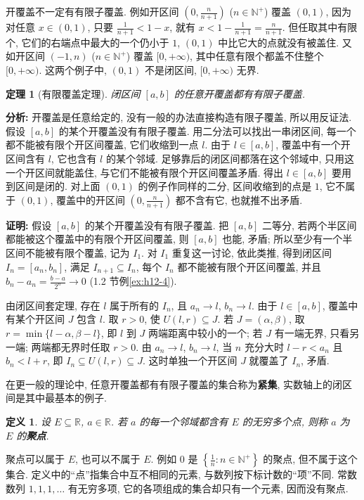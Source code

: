 \documentclass[UTF8,openany]{ctexbook}
\theoremstyle{chinesetextbook}
\newtheorem{definition}{定义}[section]
\newtheorem{theorem}{定理}[section]
\newenvironment{cnproof}{\par\indent\textbf{证明:} \ignorespaces}{\par}
\begin{document}
开覆盖不一定有有限子覆盖. 例如开区间 $\displaystyle\left(0,\frac n{n+1}\right)$ ($n\in\mathbb N^+$) 覆盖 $(0,1)$, 因为对任意 $x\in(0,1)$, 只要 $\displaystyle\frac1{n+1}<1-x$, 就有 $\displaystyle x<1-\frac1{n+1}=\frac n{n+1}$. 但任取其中有限个, 它们的右端点中最大的一个仍小于 $1$, $(0,1)$ 中比它大的点就没有被盖住. 又如开区间 $(-1,n)$ ($n\in\mathbb N^+$) 覆盖 $[0,+\infty)$, 其中任意有限个都盖不住整个 $[0,+\infty)$. 这两个例子中, $(0,1)$ 不是闭区间, $[0,+\infty)$ 无界.
\begin{theorem}[有限覆盖定理]
闭区间 $[a,b]$ 的任意开覆盖都有有限子覆盖.
\end{theorem}
\par\indent\textbf{分析:} 开覆盖是任意给定的, 没有一般的办法直接构造有限子覆盖, 所以用反证法. 假设 $[a,b]$ 的某个开覆盖没有有限子覆盖. 用二分法可以找出一串闭区间, 每一个都不能被有限个开区间覆盖, 它们收缩到一点 $l$. 由于 $l\in[a,b]$, 覆盖中有一个开区间含有 $l$, 它也含有 $l$ 的某个邻域. 足够靠后的闭区间都落在这个邻域中, 只用这一个开区间就能盖住, 与它们不能被有限个开区间覆盖矛盾. 得出 $l\in[a,b]$ 要用到区间是闭的. 对上面 $(0,1)$ 的例子作同样的二分, 区间收缩到的点是 $1$, 它不属于 $(0,1)$, 覆盖中的开区间 $\displaystyle\left(0,\frac n{n+1}\right)$ 都不含有它, 也就推不出矛盾.
\begin{cnproof}
假设 $[a,b]$ 的某个开覆盖没有有限子覆盖. 把 $[a,b]$ 二等分, 若两个半区间都能被这个覆盖中的有限个开区间覆盖, 则 $[a,b]$ 也能, 矛盾; 所以至少有一个半区间不能被有限个覆盖, 记为 $I_1$. 对 $I_1$ 重复这一讨论, 依此类推, 得到闭区间 $I_n=[a_n,b_n]$, 满足 $I_{n+1}\subseteq I_n$, 每个 $I_n$ 都不能被有限个开区间覆盖, 并且 $\displaystyle b_n-a_n=\frac{b-a}{2^n}\to0$ (1.2 节例\ref{ex:h12-4}).

由闭区间套定理, 存在 $l$ 属于所有的 $I_n$, 且 $a_n\to l$, $b_n\to l$. 由于 $l\in[a,b]$, 覆盖中有某个开区间 $J$ 包含 $l$. 取 $r>0$, 使 $U(l,r)\subseteq J$. 若 $J=(\alpha,\beta)$, 取 $r=\min\{l-\alpha,\beta-l\}$, 即 $l$ 到 $J$ 两端距离中较小的一个; 若 $J$ 有一端无界, 只看另一端; 两端都无界时任取 $r>0$. 由 $a_n\to l$, $b_n\to l$, 当 $n$ 充分大时 $l-r<a_n$ 且 $b_n<l+r$, 即 $I_n\subseteq U(l,r)\subseteq J$. 这时单独一个开区间 $J$ 就覆盖了 $I_n$, 矛盾.
\end{cnproof}
在更一般的理论中, 任意开覆盖都有有限子覆盖的集合称为\textbf{紧集}, 实数轴上的闭区间是其中最基本的例子.
\begin{definition}
设 $E\subseteq\mathbb R$, $a\in\mathbb R$. 若 $a$ 的每一个邻域都含有 $E$ 的无穷多个点, 则称 $a$ 为 $E$ 的\textbf{聚点}.
\end{definition}
聚点可以属于 $E$, 也可以不属于 $E$. 例如 $0$ 是 $\displaystyle\left\{\frac1n:n\in\mathbb N^+\right\}$ 的聚点, 但不属于这个集合. 定义中的“点”指集合中互不相同的元素, 与数列按下标计数的“项”不同. 常数数列 $1,1,1,\ldots$ 有无穷多项, 它的各项组成的集合却只有一个元素, 因而没有聚点.
\end{document}
